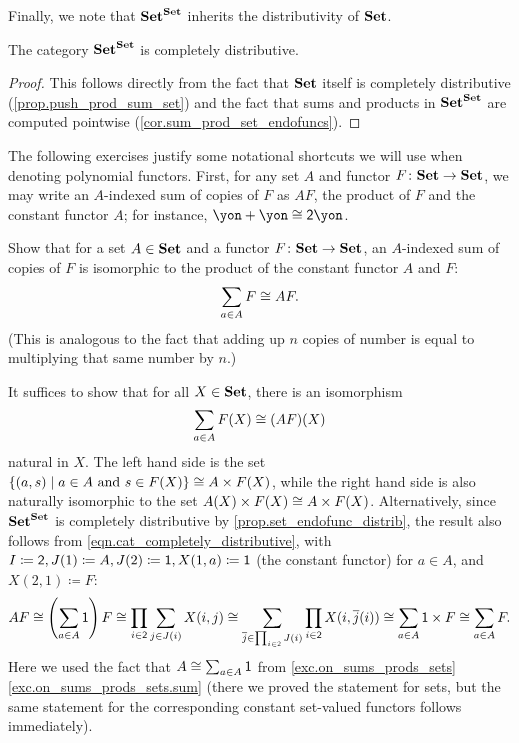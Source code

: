 \documentclass[Book-Poly]{subfiles}
\begin{document}

Finally, we note that $\mathbf{Set}^{\mathbf{Set}}$ inherits the distributivity of $\mathbf{Set}$.

\begin{proposition}\label{prop.set_endofunc_distrib}
    The category $\mathbf{Set}^{\mathbf{Set}}$ is completely distributive.
\end{proposition}
\begin{proof}
    This follows directly from the fact that $\mathbf{Set}$ itself is completely distributive (\cref{prop.push_prod_sum_set}) and the fact that sums and products in $\mathbf{Set}^{\mathbf{Set}}$ are computed pointwise (\cref{cor.sum_prod_set_endofuncs}).
\end{proof}

The following exercises justify some notational shortcuts we will use when denoting polynomial functors.
First, for any set $A$ and functor $F\colon\mathbf{Set}\to\mathbf{Set}$, we may write an $A$-indexed sum of copies of $F$ as $AF$, the product of $F$ and the constant functor $A$; for instance, $\yon+\yon\iso\2\yon$.

\begin{exercise} \label{exc.repeated_sum_is_product}
    Show that for a set $A\in\mathbf{Set}$ and a functor $F\colon\mathbf{Set}\to\mathbf{Set}$, an $A$-indexed sum of copies of $F$ is isomorphic to the product of the constant functor $A$ and $F$:
    \[
    \sum_{a \in A}F\cong AF.
    \]
    (This is analogous to the fact that adding up $n$ copies of number is equal to multiplying that same number by $n$.)
    \begin{solution}
        It suffices to show that for all $X\in\mathbf{Set}$, there is an isomorphism
        \[
        \sum_{a\in A}F(X)\cong(AF)(X)
        \]
        natural in $X$.
        The left hand side is the set $\{(a,s)\mid a\in A\text{ and }s\in F(X)\} \cong A \times F(X)$, while the right hand side is also naturally isomorphic to the set $A(X)\times F(X)\cong A\times F(X)$.
        Alternatively, since $\mathbf{Set}^{\mathbf{Set}}$ is completely distributive by \cref{prop.set_endofunc_distrib}, the result also follows from \eqref{eqn.cat_completely_distributive}, with $I\coloneqq\textsf{2}, J(1)\coloneqq A, J(2)\coloneqq\textsf{1}, X(1,a)\coloneqq\textsf{1}$ (the constant functor) for $a\in A$, and $X(2,1)\coloneqq F$:
        \[
        AF \cong
        \left(\sum_{a\in A}\textsf{1}\right)F \cong
        \prod_{i\in\textsf{2}}\sum_{j\in J(i)}X(i,j)
        \cong
        \sum_{\overline{j}\in\prod_{i\in\textsf{2}}J(i)}\prod_{i\in\textsf{2}}X(i,\overline{j}(i))
        \cong
        \sum_{a\in A}\textsf{1}\times F
        \cong
        \sum_{a\in A}F.
        \]
        Here we used the fact that $A\cong\sum_{a\in A}\textsf{1}$ from \cref{exc.on_sums_prods_sets} \cref{exc.on_sums_prods_sets.sum} (there we proved the statement for sets, but the same statement for the corresponding constant set-valued functors follows immediately).
    \end{solution}
\end{exercise}
\end{document}
